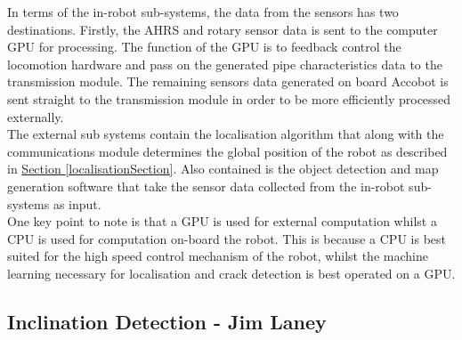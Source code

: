 \documentclass[11pt]{article}		%
\newcommand{\sectref}[1]{\hyperref[#1]{Section \ref*{#1}}}     %
\begin{document}
	        \hspace*{3ex}In terms of the in-robot sub-systems, the data from the sensors has two destinations. Firstly, the AHRS and rotary sensor data is sent to the computer GPU for processing. The function of the GPU is to feedback control the locomotion hardware and pass on the generated pipe characteristics data to the transmission module.   
	         The remaining sensors data generated on board Accobot is sent straight to the transmission module in order to be more efficiently processed externally.
	         \\
	        \hspace*{3ex}The external sub systems contain the localisation algorithm that along with the communications module determines the global position of the robot as described in \sectref{localisationSection}. Also contained is the object detection and map generation software that take the sensor data collected from the in-robot sub-systems as input.
	        \\
	        \hspace*{3ex}One key point to note is that a GPU is used for external computation whilst a CPU is used for computation on-board the robot. This is because a CPU is best suited for the high speed control mechanism of the robot, whilst the machine learning necessary for localisation and crack detection is best operated on a GPU.
	          
		\subsection[Inclination Detection]{Inclination Detection - Jim Laney} \label{poseCalculation}
		
\end{document}
